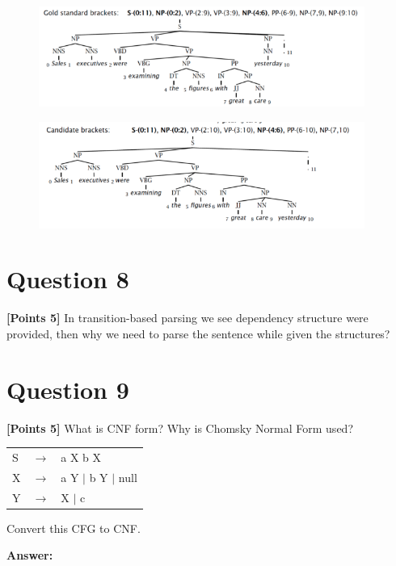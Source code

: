 \documentclass[12pt]{article}
\begin{document}
\begin{figure}[!ht]
      \centering
      \includegraphics[width=0.95\textwidth]{assets/test2/gold_standard_brackets.png}
\end{figure}

\begin{figure}[!ht]
      \centering
      \includegraphics[width=0.95\textwidth]{assets/test2/candidate_brackets.png}
\end{figure}

\newpage
\section*{Question 8}
\textbf{[Points 5]} In transition-based parsing we see dependency structure were
provided, then why we need to parse the sentence while given the structures?

\newpage
\section*{Question 9}
\textbf{[Points 5]} What is CNF form? Why is Chomsky Normal Form used?

\begin{tabular}{lll}
      S & $\rightarrow$ & a X b X              \\
      X & $\rightarrow$ & a Y $|$ b Y $|$ null \\
      Y & $\rightarrow$ & X $|$ c              \\
\end{tabular}

Convert this CFG to CNF.

\textbf{Answer:}
\end{document}
